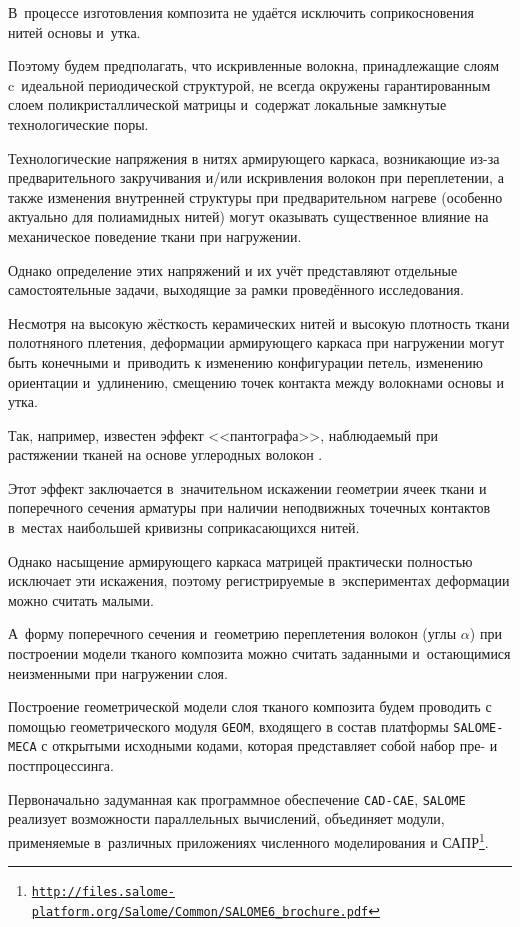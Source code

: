 В~процессе изготовления композита не удаётся исключить соприкосновения нитей основы и~утка. 

Поэтому будем предполагать, что искривленные волокна, принадлежащие слоям c~идеальной периодической структурой, не всегда окружены гарантированным слоем поликристаллической матрицы и~содержат локальные замкнутые технологические поры.



Технологические напряжения в нитях армирующего каркаса, возникающие из-за предварительного закручивания и/или искривления волокон при переплетении, а также изменения внутренней структуры при предварительном нагреве (особенно актуально для полиамидных нитей) могут оказывать существенное влияние на механическое поведение ткани при нагружении. 

Однако определение этих напряжений и их учёт представляют отдельные самостоятельные задачи, выходящие за рамки проведённого исследования. 

Несмотря на высокую жёсткость керамических нитей и высокую плотность ткани полотняного плетения, деформации армирующего каркаса при нагружении могут быть конечными и~приводить к изменению конфигурации петель, изменению ориентации и~удлинению, смещению точек контакта между волокнами основы и утка. 

Так, например, известен эффект <<пантографа>>, наблюдаемый при  растяжении тканей на основе углеродных волокон \cite{dedkov:bib:cao, dedkov:bib:harrison}. 

Этот эффект заключается в~значительном искажении геометрии ячеек ткани и поперечного сечения арматуры при наличии неподвижных точечных контактов в~местах наибольшей кривизны соприкасающихся нитей. 

Однако насыщение армирующего каркаса матрицей практически полностью исключает эти искажения, поэтому регистрируемые в~экспериментах деформации можно считать малыми. 

А~форму поперечного сечения и~геометрию переплетения волокон (углы  $\alpha$) при построении модели тканого композита можно считать заданными и~остающимися неизменными при нагружении слоя.



Построение геометрической модели слоя тканого композита будем проводить с помощью геометрического модуля {\tt GEOM}, входящего в состав платформы {\tt SALOME-MECA} с открытыми исходными кодами, которая представляет собой набор пре- и постпроцессинга. 

Первоначально задуманная как программное обеспечение {\tt CAD-CAE}, {\tt SALOME} реализует возможности параллельных вычислений, объединяет модули, применяемые в~различных приложениях численного моделирования и САПР\footnote{\href{http://files.salome-platform.org/Salome/Common/SALOME6_brochure.pdf}{\tt http://files.salome-platform.org/Salome/Common/SALOME6\_brochure.pdf}}\!\!. %

